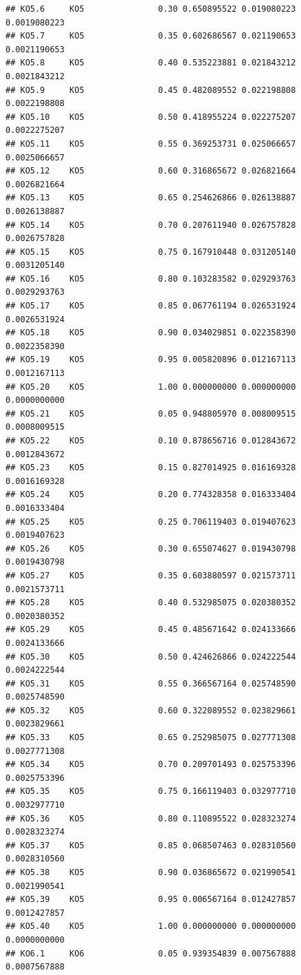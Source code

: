 \documentclass[
]{book}
\begin{document}
\begin{verbatim}
## KO5.6     KO5               0.30 0.650895522 0.019080223 0.0019080223
## KO5.7     KO5               0.35 0.602686567 0.021190653 0.0021190653
## KO5.8     KO5               0.40 0.535223881 0.021843212 0.0021843212
## KO5.9     KO5               0.45 0.482089552 0.022198808 0.0022198808
## KO5.10    KO5               0.50 0.418955224 0.022275207 0.0022275207
## KO5.11    KO5               0.55 0.369253731 0.025066657 0.0025066657
## KO5.12    KO5               0.60 0.316865672 0.026821664 0.0026821664
## KO5.13    KO5               0.65 0.254626866 0.026138887 0.0026138887
## KO5.14    KO5               0.70 0.207611940 0.026757828 0.0026757828
## KO5.15    KO5               0.75 0.167910448 0.031205140 0.0031205140
## KO5.16    KO5               0.80 0.103283582 0.029293763 0.0029293763
## KO5.17    KO5               0.85 0.067761194 0.026531924 0.0026531924
## KO5.18    KO5               0.90 0.034029851 0.022358390 0.0022358390
## KO5.19    KO5               0.95 0.005820896 0.012167113 0.0012167113
## KO5.20    KO5               1.00 0.000000000 0.000000000 0.0000000000
## KO5.21    KO5               0.05 0.948805970 0.008009515 0.0008009515
## KO5.22    KO5               0.10 0.878656716 0.012843672 0.0012843672
## KO5.23    KO5               0.15 0.827014925 0.016169328 0.0016169328
## KO5.24    KO5               0.20 0.774328358 0.016333404 0.0016333404
## KO5.25    KO5               0.25 0.706119403 0.019407623 0.0019407623
## KO5.26    KO5               0.30 0.655074627 0.019430798 0.0019430798
## KO5.27    KO5               0.35 0.603880597 0.021573711 0.0021573711
## KO5.28    KO5               0.40 0.532985075 0.020380352 0.0020380352
## KO5.29    KO5               0.45 0.485671642 0.024133666 0.0024133666
## KO5.30    KO5               0.50 0.424626866 0.024222544 0.0024222544
## KO5.31    KO5               0.55 0.366567164 0.025748590 0.0025748590
## KO5.32    KO5               0.60 0.322089552 0.023829661 0.0023829661
## KO5.33    KO5               0.65 0.252985075 0.027771308 0.0027771308
## KO5.34    KO5               0.70 0.209701493 0.025753396 0.0025753396
## KO5.35    KO5               0.75 0.166119403 0.032977710 0.0032977710
## KO5.36    KO5               0.80 0.110895522 0.028323274 0.0028323274
## KO5.37    KO5               0.85 0.068507463 0.028310560 0.0028310560
## KO5.38    KO5               0.90 0.036865672 0.021990541 0.0021990541
## KO5.39    KO5               0.95 0.006567164 0.012427857 0.0012427857
## KO5.40    KO5               1.00 0.000000000 0.000000000 0.0000000000
## KO6.1     KO6               0.05 0.939354839 0.007567888 0.0007567888

\end{verbatim}
\end{document}
